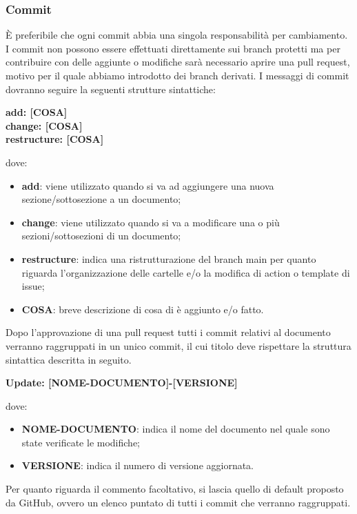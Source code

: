 \subsubsection{Commit}\label{inf:comm}
È preferibile che ogni commit abbia una singola responsabilità per cambiamento.
I commit non possono essere effettuati direttamente sui branch protetti ma per contribuire con delle aggiunte o
modifiche sarà necessario aprire una pull request, motivo per il quale abbiamo introdotto dei branch derivati.
I messaggi di commit dovranno seguire la seguenti strutture sintattiche:
\begin{center}
      \textbf{add: [COSA]\\
      change: [COSA]\\
      restructure: [COSA]}
\end{center}
dove:
\begin{itemize}
      \item \textbf{add}: viene utilizzato quando si va ad aggiungere una nuova sezione/sottosezione a un documento;
      \item \textbf{change}: viene utilizzato quando si va a modificare una o più sezioni/sottosezioni di un documento;
      \item \textbf{restructure}: indica una ristrutturazione del branch main per quanto riguarda l'organizzazione delle cartelle e/o la modifica di action o template di issue;
      \item \textbf{COSA}: breve descrizione di cosa di è aggiunto e/o fatto.
\end{itemize}

Dopo l'approvazione di una pull request tutti i commit relativi al documento
verranno raggruppati in un unico commit, il cui titolo deve rispettare la
struttura sintattica descritta in seguito.
\begin{center}
      \textbf{Update: [NOME-DOCUMENTO]-[VERSIONE]}
\end{center}
dove:

\begin{itemize}
      \item \textbf{NOME-DOCUMENTO}: indica il nome del documento nel quale sono state verificate le modifiche;
      \item \textbf{VERSIONE}: indica il numero di versione aggiornata.
\end{itemize}
Per quanto riguarda il commento facoltativo, si lascia quello di default proposto da GitHub,
ovvero un elenco puntato di tutti i commit che verranno raggruppati.\\

